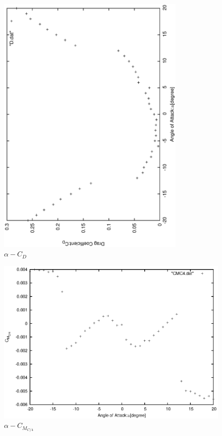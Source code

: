 \documentclass[a4j,twoside,openright,11pt]{jarticle}
\begin{document}
\begin{figure}[htbp]
\begin{center}
\includegraphics[width=9cm,angle=-90]{./CD/CD.eps}
\end{center}
\caption{$\alpha - C_D$}
\end{figure}

\begin{figure}[htbp]
\begin{center}
\includegraphics[width=12cm]{./CMC4/CMC4.eps}
\end{center}
\caption{$\alpha - C_{M_{C/4}}$}
\end{figure}
\end{document}
